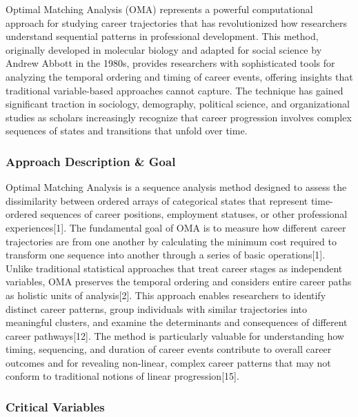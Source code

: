 \documentclass[./main.tex]{subfiles}
\begin{document}
Optimal Matching Analysis (OMA) represents a powerful computational
approach for studying career trajectories that has revolutionized how
researchers understand sequential patterns in professional development.
This method, originally developed in molecular biology and adapted for
social science by Andrew Abbott in the 1980s, provides researchers with
sophisticated tools for analyzing the temporal ordering and timing of
career events, offering insights that traditional variable-based
approaches cannot capture. The technique has gained significant traction
in sociology, demography, political science, and organizational studies
as scholars increasingly recognize that career progression involves
complex sequences of states and transitions that unfold over time.

\subsubsection{Approach Description \&
Goal}\label{approach-description-goal}

Optimal Matching Analysis is a sequence analysis method designed to
assess the dissimilarity between ordered arrays of categorical states
that represent time-ordered sequences of career positions, employment
statuses, or other professional experiences{[}1{]}. The fundamental goal
of OMA is to measure how different career trajectories are from one
another by calculating the minimum cost required to transform one
sequence into another through a series of basic operations{[}1{]}.
Unlike traditional statistical approaches that treat career stages as
independent variables, OMA preserves the temporal ordering and considers
entire career paths as holistic units of analysis{[}2{]}. This approach
enables researchers to identify distinct career patterns, group
individuals with similar trajectories into meaningful clusters, and
examine the determinants and consequences of different career
pathways{[}12{]}. The method is particularly valuable for understanding
how timing, sequencing, and duration of career events contribute to
overall career outcomes and for revealing non-linear, complex career
patterns that may not conform to traditional notions of linear
progression{[}15{]}.

\subsubsection{Critical Variables}\label{critical-variables}
\end{document}
